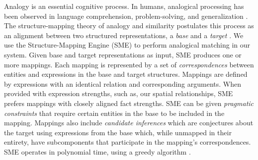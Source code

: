 \documentclass[letterpaper]{article}
\begin{document}
Analogy is an essential cognitive process. In humans, analogical processing has been observed in language comprehension, problem-solving, and generalization \cite{Gentner2003}. The structure-mapping theory of analogy and similarity postulates this process as an alignment between two structured representations, a \textit{base} and a \textit{target} \cite{Gentner1983a}. 
We use the Structure-Mapping Engine (SME) \cite{Falkenhainer1989a} to perform analogical matching in our system. Given base and target representations as input, SME produces one or more mappings. Each mapping is represented by a set of \textit{correspondences} between entities and expressions in the base and target structures. Mappings are defined by expressions with an identical relation and corresponding arguments. When provided with expression strengths, such as, our spatial relationships, SME prefers mappings with closely aligned fact strengths. SME can be given \textit{pragmatic constraints} that require certain entities in the base to be included in the mapping. Mappings also include \textit{candidate inferences} which are conjectures about the target using expressions from the base which, while unmapped in their entirety, have subcomponents that participate in the mapping's correspondences. SME operates in polynomial time, using a greedy algorithm \cite{Forbus/etal1994}.
\end{document}
